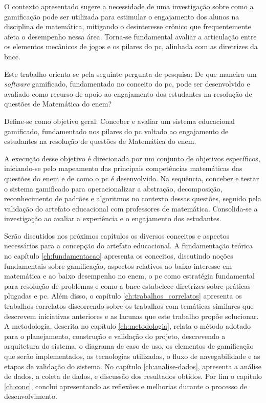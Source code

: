 O contexto apresentado sugere a necessidade de uma investigação sobre
como a gamificação pode ser utilizada para estimular o engajamento dos alunos na
disciplina de matemática, mitigando o desinteresse crônico que frequentemente
afeta o desempenho nessa área. Torna-se fundamental avaliar a articulação entre
os elementos mecânicos de jogos e os pilares do \gls{pc}, alinhada com as diretrizes
da \gls{bncc}.

Este trabalho orienta-se pela seguinte pergunta de pesquisa: De que maneira um
\textit{software} gamificado, fundamentado no conceito do \gls{pc}, pode ser desenvolvido e avaliado como recurso de apoio ao engajamento dos estudantes na resolução de questões de Matemática do \gls{enem}? 

Define-se como objetivo geral: Conceber e avaliar um sistema
educacional gamificado, fundamentado nos pilares do \gls{pc}
voltado ao engajamento de estudantes na resolução de questões
de Matemática do \gls{enem}.

A execução desse objetivo é direcionada por um conjunto de objetivos
específicos, iniciando-se pelo mapeamento das principais competências matemáticas
das questões do \gls{enem} e de como o \gls{pc} é desenvolvido. Na sequência,
conceber e testar o sistema gamificado para operacionalizar a abstração,
decomposição, reconhecimento de padrões e algoritmos no contexto dessas
questões, seguido pela validação do artefato educacional com professores de
matemática. Consolida-se a investigação ao avaliar a experiência e o engajamento dos
estudantes.

Serão discutidos nos próximos capítulos os diversos conceitos e aspectos
necessários para a concepção do artefato educacional. A fundamentação teórica no capítulo
\ref{ch:fundamentacao} apresenta os conceitos,
discutindo noções fundamentais sobre gamificação, aspectos relativos ao baixo
interesse em matemática e ao baixo desempenho no \gls{enem}, o \gls{pc} como estratégia
fundamental para resolução de problemas e como a \gls{bncc} estabelece diretrizes sobre
práticas plugadas e \gls{pc}. Além disso, o capítulo \ref{ch:trabalhos_correlatos} apresenta os trabalhos correlatos
discorrendo sobre os trabalhos com temáticas
similares que descrevem iniciativas anteriores e as lacunas que este trabalho
propõe solucionar. A metodologia, descrita no capítulo \ref{ch:metodologia}, relata o método
adotado para o planejamento, construção e validação do projeto,
descrevendo a arquitetura do sistema, o diagrama de caso de uso, os elementos de
gamificação que serão implementados, as tecnologias utilizadas, o fluxo de
navegabilidade e as etapas de validação do sistema. No capítulo \ref{ch:analise-dados}, apresenta a
análise de dados, a coleta de dados, e discussão dos resultados obtidos. Por fim o capítulo \ref{ch:conc},
conclui apresentando as reflexões e melhorias durante o processo de
desenvolvimento.
